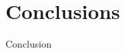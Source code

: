 \documentclass{svproc}
\begin{document}
\section{Conclusions}
Conclusion
%
%

%
%
%
%
%
%
\end{document}
